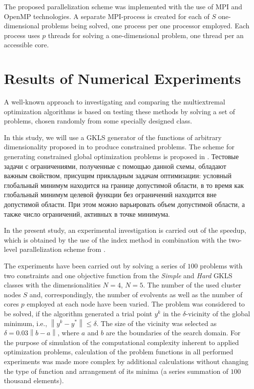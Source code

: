 \documentclass[smallextended]{svjour3}       %
\begin{document}
The proposed parallelization scheme was implemented with the use of MPI and OpenMP technologies. A separate MPI-process is created for each of $S$ one-dimensional problems being solved, one process per one processor employed. Each process uses $p$ threads for solving a one-dimensional problem, one thread per an accessible core.

\section{Results of Numerical Experiments}
\label{sec:4}

A well-known approach to investigating and comparing the multiextremal optimization algorithms is based on testing these methods by solving a set of problems, chosen randomly from some specially designed class.

In this study, we will use a GKLS generator of the functions of arbitrary dimensionality proposed in \cite{Gaviano2003} to produce constrained problems. The scheme for generating constrained global optimization problems is proposed in \cite{Gergel2017}. 
\Russian
Тестовые задачи с ограничениями, полученные с помощью данной схемы, обладают важным свойством, присущим прикладным задачам оптимизации: условный глобальный минимум находится на границе допустимой области, в то время как глобальный минимум целевой функции без ограничений находится вне допустимой области. При этом можно варьировать объем допустимой области, а также число ограничений, активных в точке минимума.

In the present study, an experimental investigation is carried out of the speedup, which is obtained by the use of the index method in combination with the two-level parallelization scheme from \cite{Sidorov2015}.

The experiments have been carried out by solving a series of $100$ problems with two constraints and one objective function from the \textit{Simple} and \textit{Hard} GKLS classes with the dimensionalities $N=4$, $N=5$. The number of the used cluster nodes $S$ and, correspondingly, the number of evolvents as well as the number of cores $p$ employed at each node have been varied. The problem was considered to be solved, if the algorithm generated a trial point $y^k$ in the $\delta$-vicinity of the global minimum, i.e., $\left\|y^k-y^*\right\|\leq \delta$. The size of the vicinity was selected as $\delta=0.03\left\|b-a\right\|$, where $a$ and $b$ are the boundaries of the search domain. For the purpose of simulation of the computational complexity inherent to applied optimization problems, calculation of the problem functions in all performed experiments was made more complex by additional calculations without changing the type of function and arrangement of its minima (a series summation of $100$ thousand elements).
\end{document}
